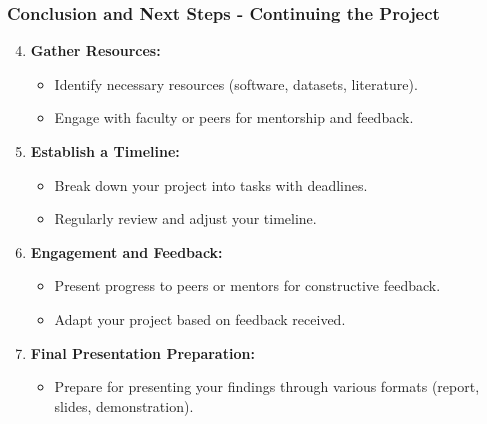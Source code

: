 \documentclass[aspectratio=169]{beamer}
\begin{document}
\begin{frame}[fragile]
    \frametitle{Conclusion and Next Steps - Continuing the Project}
    \begin{enumerate}
        \setcounter{enumi}{3}
        \item \textbf{Gather Resources:}
            \begin{itemize}
                \item Identify necessary resources (software, datasets, literature).
                \item Engage with faculty or peers for mentorship and feedback.
            \end{itemize}
        \item \textbf{Establish a Timeline:}
            \begin{itemize}
                \item Break down your project into tasks with deadlines.
                \item Regularly review and adjust your timeline.
            \end{itemize}
        \item \textbf{Engagement and Feedback:}
            \begin{itemize}
                \item Present progress to peers or mentors for constructive feedback.
                \item Adapt your project based on feedback received.
            \end{itemize}
        \item \textbf{Final Presentation Preparation:}
            \begin{itemize}
                \item Prepare for presenting your findings through various formats (report, slides, demonstration).
            \end{itemize}
    \end{enumerate}
\end{frame}
\end{document}
